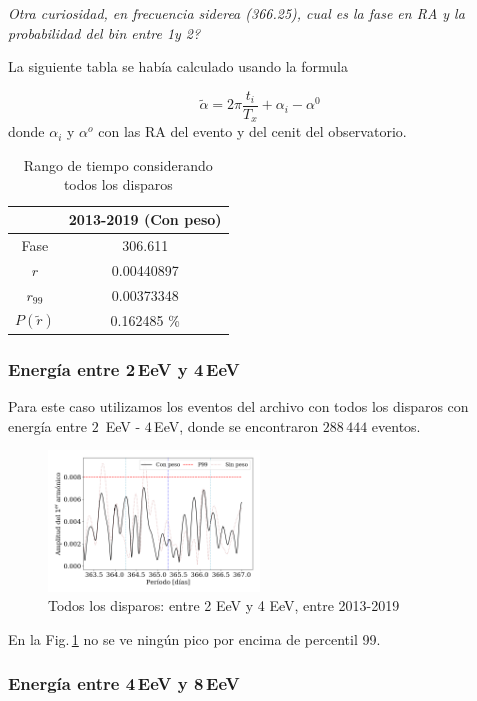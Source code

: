 \emph{Otra curiosidad, en frecuencia siderea (366.25), cual es la fase en RA y la probabilidad del bin entre 1y 2?}

La siguiente tabla se había calculado usando la formula 

\begin{equation}
	\tilde \alpha = 2\pi \frac{t_i}{T_x} +\alpha_i - \alpha^0
\end{equation}
donde $\alpha_i$ y $\alpha^o$ con las RA del evento y del cenit del observatorio.

	\begin{table}[H]
	\centering
		\begin{tabular}{c|c}
	 		&  2013-2019 (Con peso)	 \\ \hline
	Fase		& 	306.611				 \\
	$r$ 		&  0.00440897			\\
	$r_{99}$ 	&  0.00373348			\\
	$P(\tilde r)$ 	    & 	0.162485	\%	 \\
		\end{tabular}
	\caption{Rango de tiempo considerando todos los disparos} 	\label{rango_corto}
	\end{table}


\subsubsection{Energía entre 2\,EeV y 4\,EeV}

Para este caso utilizamos los eventos del archivo con todos los disparos con energía entre $2\,$ EeV - $4\,$EeV, donde se encontraron $288\,444$ eventos.
\begin{figure}[H]
	\centering
	\includegraphics[width=0.5\textwidth]{2019_AllTriggers_2_4_EeV_con_vs_sin_peso.png}
	\caption{Todos los disparos: entre 2 EeV y 4 EeV, entre 2013-2019}
	\label{fig:24w}
\end{figure}

En la Fig.\,\ref{fig:24w} no se ve ningún pico por encima de  percentil 99.


\subsubsection{Energía entre 4\,EeV y 8\,EeV}

